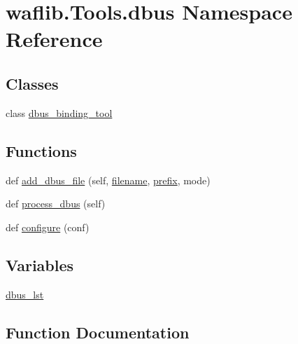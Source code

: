 \hypertarget{namespacewaflib_1_1_tools_1_1dbus}{}\section{waflib.\+Tools.\+dbus Namespace Reference}
\label{namespacewaflib_1_1_tools_1_1dbus}
\subsection*{Classes}
\begin{DoxyCompactItemize}
\item 
class \hyperlink{classwaflib_1_1_tools_1_1dbus_1_1dbus__binding__tool}{dbus\+\_\+binding\+\_\+tool}
\end{DoxyCompactItemize}
\subsection*{Functions}
\begin{DoxyCompactItemize}
\item 
def \hyperlink{namespacewaflib_1_1_tools_1_1dbus_a6984c3a3293d830848a5b9e06326a353}{add\+\_\+dbus\+\_\+file} (self, \hyperlink{test__portburn_8cpp_a7efa5e9c7494c7d4586359300221aa5d}{filename}, \hyperlink{structprefix}{prefix}, mode)
\item 
def \hyperlink{namespacewaflib_1_1_tools_1_1dbus_a75dbed39a93f5b22ad67c948e91f2008}{process\+\_\+dbus} (self)
\item 
def \hyperlink{namespacewaflib_1_1_tools_1_1dbus_abce63288e0395b45e8006bd6cc81edb7}{configure} (conf)
\end{DoxyCompactItemize}
\subsection*{Variables}
\begin{DoxyCompactItemize}
\item 
\hyperlink{namespacewaflib_1_1_tools_1_1dbus_a94d07205be12377e99317201fa5601f4}{dbus\+\_\+lst}
\end{DoxyCompactItemize}


\subsection{Function Documentation}
